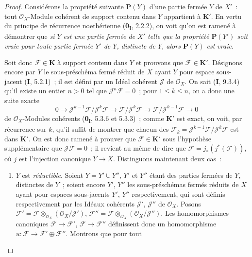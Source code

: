 \begin{proof}
Considérons la propriété suivante $\boldsymbol{P}(Y)$ d'une partie fermée $Y$ de $X'$~:
tout $\mathcal O_X$-Module cohérent de support contenu dans $Y$ appartient à
$\boldsymbol{K}'$. En vertu du principe de récurrence noethérienne (\textbf{0}\textsubscript{I},
2.2.2), on voit qu'on est ramené à démontrer que \emph{si $Y$ est une partie
fermée de $X'$ telle que la propriété $\boldsymbol{P}(Y')$ soit vraie pour toute partie
fermée $Y'$ de $Y$, distincte de $Y$, alors $\boldsymbol{P}(Y)$ est vraie}.

Soit donc $\mathcal F\in\boldsymbol{K}$ à support contenu dans $Y$ et prouvons que
$\mathcal F\in\boldsymbol{K}'$. Désignons encore par $Y$ le sous-préschéma fermé réduit de
$X$ ayant $Y$ pour espace sous-jacent (\textbf{I}, 5.2.1)~; il est défini par un Idéal
cohérent $\mathcal J$ de $\mathcal O_X$. On sait (\textbf{I}, 9.3.4) qu'il existe un
entier $n>0$ tel que $\mathcal J^n\mathcal F=0$~; pour $1\leq k\leq n$, on a
donc une suite exacte
\[
0\longrightarrow
\mathcal J^{k-1}\mathcal F/\mathcal J^k\mathcal F
\longrightarrow \mathcal F/\mathcal J^k\mathcal F
\longrightarrow \mathcal F/\mathcal J^{k-1}\mathcal F
\longrightarrow0
\]
de $\mathcal O_X$-Modules cohérents (\textbf{0}\textsubscript{I}, 5.3.6 et 5.3.3)~;
comme $\boldsymbol{K}'$ est exact, on voit, par récurrence sur $k$, qu'il suffit de montrer
que chacun des
$\mathcal F_k=\mathcal J^{k-1}\mathcal F/\mathcal J^k\mathcal F$ est dans
$\boldsymbol{K}'$. On est donc ramené à prouver que $\mathcal F\in\boldsymbol{K}'$ sous l'hypothèse
supplémentaire que $\mathcal J\mathcal F=0$~; il revient au même de dire que
$\mathcal F=j_*(j^*(\mathcal F))$, où $j$ est l'injection canonique
$Y\to X$. Distinguons maintenant deux cas~:
\begin{enumerate}
\item[\textit{a)}] $Y$ est \emph{réductible}. Soient $Y=Y'\cup Y''$, $Y'$ et $Y''$
étant des parties fermées de $Y$, distinctes de $Y$~; soient encore $Y'$,
$Y''$ les sous-préschémas fermés réduits de $X$ ayant pour espaces
sous-jacents $Y'$, $Y''$ respectivement, qui sont définis respectivement par
les Idéaux cohérents $\mathcal J'$, $\mathcal J''$ de $\mathcal O_X$. Posons
$\mathcal F'=\mathcal F\otimes_{\mathcal O_X}
(\mathcal O_X/\mathcal J')$,
$\mathcal F''=\mathcal F\otimes_{\mathcal O_X}
(\mathcal O_X/\mathcal J'')$.
Les homomorphismes canoniques $\mathcal F\to\mathcal F'$,
$\mathcal F\to\mathcal F''$ définissent donc un homomorphisme
$u:\mathcal F\to\mathcal F'\oplus\mathcal F''$. Montrons que pour tout

\end{enumerate}
\end{proof}
